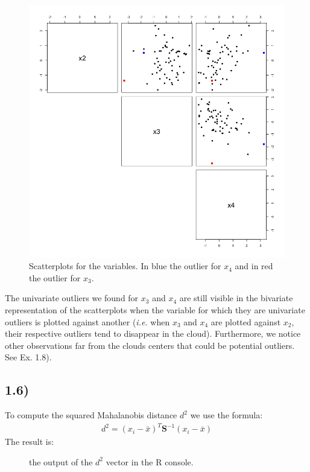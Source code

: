 \documentclass[a4paper,11pt,oneside]{report}
\begin{document}
	\begin{figure}[H]
	\centering
	\includegraphics[scale = 0.5]{pairs_scatterplot1_ex1.png}
	\caption{Scatterplots for the variables. In blue the outlier for $x_4$ and in red the outlier for $x_3$.}
	\end{figure}
	The univariate outliers we found for $x_3$ and $x_4$ are still visible in the bivariate representation of the scatterplots when the variable for which they are univariate outliers is plotted against another (\textit{i.e.} when $x_3$ and $x_4$ are plotted against $x_2$, their respective outliers tend to disappear in the cloud). Furthermore, we notice other observations far from the clouds centers that could be potential outliers. See Ex. 1.8).

\subsection*{1.6)}
	To compute the squared Mahalanobis distance $d^2$ we use the formula:
	\begin{align}
	d^2 = (x_i - \bar x)^T \mathbf{S}^{-1} (x_i - \bar x) \nonumber
	\end{align}
	The result is:
	\begin{figure}[H]
	
	\caption{the output of the $d^2$ vector in the R console.}
	\end{figure}
\end{document}

